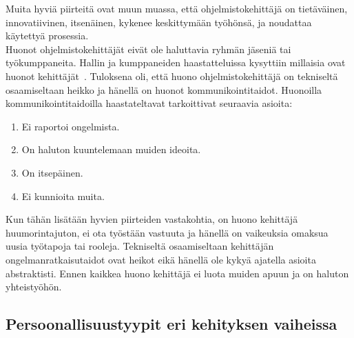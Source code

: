 \documentclass[finnish]{../tktltiki2}
\theoremstyle{definition}
\theoremstyle{remark}
\begin{document}
Muita hyviä piirteitä ovat muun muassa, että ohjelmistokehittäjä
on tietäväinen, innovatiivinen, itsenäinen, kykenee keskittymään työhönsä, ja noudattaa käytettyä prosessia.\\

Huonot ohjelmistokehittäjät eivät ole haluttavia ryhmän jäseniä tai
työkumppaneita. Hallin ja kumppaneiden haastatteluissa kysyttiin millaisia ovat huonot kehittäjät~\cite{Hall:2007:CNT:1235000.1235043}. Tuloksena oli, että huono ohjelmistokehittäjä on tekniseltä osaamiseltaan heikko ja hänellä on huonot kommunikointitaidot. Huonoilla kommunikointitaidoilla haastateltavat tarkoittivat seuraavia asioita:

\begin{enumerate}

\item Ei raportoi ongelmista.
\item On haluton kuuntelemaan muiden ideoita.
\item On itsepäinen.
\item Ei kunnioita muita.

\end{enumerate}

Kun tähän lisätään hyvien piirteiden vastakohtia, on huono kehittäjä huumorintajuton, ei ota työstään vastuuta ja hänellä on vaikeuksia omaksua uusia työtapoja tai rooleja. Tekniseltä osaamiseltaan kehittäjän ongelmanratkaisutaidot ovat heikot eikä hänellä ole kykyä ajatella asioita abstraktisti. Ennen kaikkea huono kehittäjä ei luota muiden apuun ja on haluton yhteistyöhön.\\


\subsection{Persoonallisuustyypit eri kehityksen vaiheissa}
\end{document}
